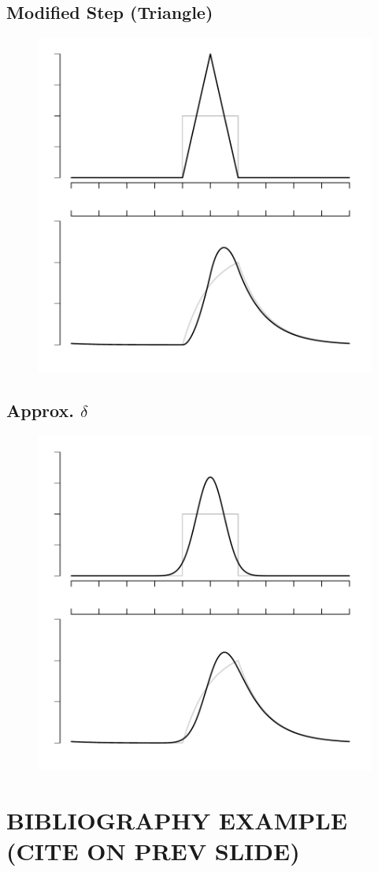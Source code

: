 \documentclass{article}
\begin{document}
\subsection{Modified Step (Triangle)}
\begin{figure}
\begin{center}
\includegraphics{template-pstri}
\end{center}
\end{figure}

\subsection{Approx. $\delta$}
\begin{figure}
\begin{center}
\includegraphics{template-psdel}
\end{center}
\end{figure}

\section{BIBLIOGRAPHY EXAMPLE (CITE ON PREV SLIDE)}
{}

\end{document}
